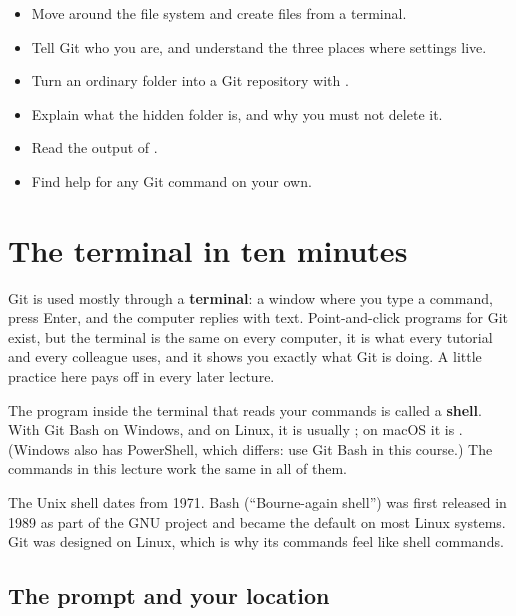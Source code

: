 


\begin{goals}
\begin{itemize}
  \item Move around the file system and create files from a terminal.
  \item Tell Git who you are, and understand the three places where settings live.
  \item Turn an ordinary folder into a Git repository with .
  \item Explain what the hidden  folder is, and why you must not delete it.
  \item Read the output of .
  \item Find help for any Git command on your own.
\end{itemize}
\end{goals}

\section{The terminal in ten minutes}

Git is used mostly through a \textbf{terminal}: a window where you type a command, press Enter, and the computer replies with text. Point-and-click programs for Git exist, but the terminal is the same on every computer, it is what every tutorial and every colleague uses, and it shows you exactly what Git is doing. A little practice here pays off in every later lecture.

The program inside the terminal that reads your commands is called a \textbf{shell}. With Git Bash on Windows, and on Linux, it is usually ; on macOS it is . (Windows also has PowerShell, which differs: use Git Bash in this course.) The commands in this lecture work the same in all of them.

\begin{history}
The Unix shell dates from 1971. Bash (``Bourne-again shell'') was first released in 1989 as part of the GNU project and became the default on most Linux systems. Git was designed on Linux, which is why its commands feel like shell commands.
\end{history}

\subsection{The prompt and your location}

